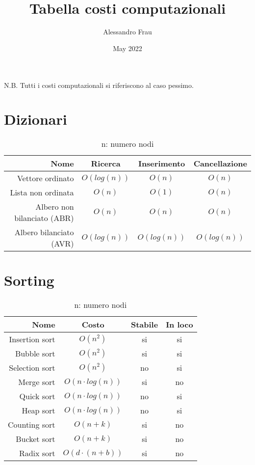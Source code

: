 \documentclass{article}
\title{Tabella costi computazionali}
\author{Alessandro Frau}
\date{May 2022}
\begin{document}
\maketitle
\tableofcontents
N.B. Tutti i costi computazionali si riferiscono al caso pessimo.
\section{Dizionari}
\begin{table}[H]
    \centering
    \def\arraystretch{1.5}
    \begin{tabular}{|r|c|c|c|} \hline
          \textbf{Nome} & \textbf{Ricerca} & \textbf{Inserimento} & \textbf{Cancellazione}\\ \hline
          Vettore ordinato & $O(log(n))$ & $O(n)$ & $O(n)$ \\ \hline
          Lista non ordinata & $O(n)$ & $O(1)$ & $O(n)$ \\ \hline
          Albero non bilanciato (ABR) & $O(n)$ & $O(n)$ & $O(n)$ \\ \hline
          Albero bilanciato (AVR) & $O(log(n))$ & $O(log(n))$ & $O(log(n))$ \\ \hline
    \end{tabular}
    \caption{n: numero nodi}
    \label{tab:my_label}
\end{table}
\newpage
\section{Sorting}
\begin{table}[H]
    \centering
    \def\arraystretch{1.5}
    \begin{tabular}{|r|c|c|c|} \hline
          \textbf{Nome} & \textbf{Costo} & \textbf{Stabile} & \textbf{In loco}\\ \hline
          Insertion sort & $O(n^2)$ & \cellcolor{green}si & \cellcolor{green}si \\ \hline
          Bubble sort & $O(n^2)$ & \cellcolor{green}si & \cellcolor{green}si \\ \hline
          Selection sort & $O(n^2)$ & \cellcolor{red}no & \cellcolor{green}si \\ \hline
          Merge sort & $O(n\cdot log(n))$ & \cellcolor{green}si & \cellcolor{red}no \\ \hline
          Quick sort & $O(n\cdot log(n))$ & \cellcolor{red}no & \cellcolor{green}si \\ \hline
          Heap sort & $O(n\cdot log(n))$ & \cellcolor{red}no & \cellcolor{green}si \\ \hline
          Counting sort & $O(n+k)$ & \cellcolor{green}si & \cellcolor{red}no \\ \hline
          Bucket sort & $O(n+k)$ & \cellcolor{green}si & \cellcolor{red}no \\ \hline
          Radix sort & $O(d \cdot (n+b))$ & \cellcolor{green}si & \cellcolor{red}no \\ \hline
    \end{tabular}
    \caption{n: numero nodi}
    \label{tab:my_label}
\end{table}
\end{document}
